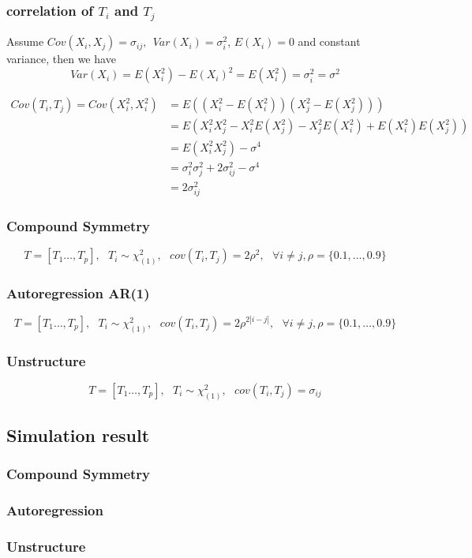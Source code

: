 \documentclass[]{article}
\begin{document}
\subsubsection{\texorpdfstring{correlation of \(T_i\) and
\(T_j\)}{correlation of T\_i and T\_j}}\label{correlation-of-t_i-and-t_j}

Assume \(Cov(X_i,X_j) = \sigma_{ij}, ~~ Var(X_i) = \sigma_i^2\),
\(E(X_i) = 0\) and constant variance, then we have \[
  Var(X_i) = E(X_i^2) - E(X_i)^2 = E(X_i^2) = \sigma_i^2 = \sigma^2
\]

\begin{align*}
  Cov(T_i, T_j) = Cov(X_i^2, X_i^2) &= E\left((X_i^2 - E(X_i^2))(X_j^2 - E(X_j^2))\right) \\ 
                                    &= E(X_i^2X_j^2 - X_i^2E(X_j^2) - X_j^2E(X_i^2) + E(X_i^2)E(X_j^2)) \\
                                    &= E(X_i^2X_j^2) - \sigma^4 \\ 
                                    &= \sigma_i^2\sigma_j^2 + 2\sigma_{ij}^2 - \sigma^4 \\ 
                                    &= 2\sigma^2_{ij}
\end{align*}

\subsubsection{Compound Symmetry}\label{compound-symmetry}

\[
  T = [T_1 \dots, T_p] ,~~~ T_i \sim \chi_{(1)}^2, ~~~ cov(T_i, T_j) = 2\rho^2,~~~ \forall  i \ne j, \rho = \{0.1, \dots, 0.9 \} 
\]

\subsubsection{Autoregression AR(1)}\label{autoregression-ar1}

\[
  T = [T_1 \dots, T_p] ,~~~ T_i \sim \chi_{(1)}^2, ~~~ cov(T_i, T_j) = 2\rho^{2|i-j|},~~~ \forall  i \ne j, \rho = \{0.1, \dots, 0.9 \} 
\]

\subsubsection{Unstructure}\label{unstructure}

\[
  T = [T_1 \dots, T_p] ,~~~ T_i \sim \chi_{(1)}^2, ~~~ cov(T_i, T_j) = \sigma_{ij}
\]

\subsection{Simulation result}\label{simulation-result}

\subsubsection{Compound Symmetry}\label{compound-symmetry-1}

\subsubsection{Autoregression}\label{autoregression}

\subsubsection{Unstructure}\label{unstructure-1}
\end{document}
